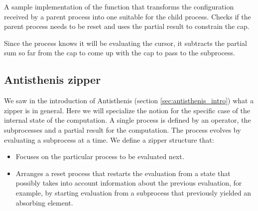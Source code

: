 \begin{code}

  \caption{\label{lst:localizeconf}A sample implementation of the
    function that transforms the configuration received by a parent
    process into one suitable for the child process. Checks if the
    parent process needs to be reset and uses the partial result to
    constrain the cap.}
\end{code}

Since the process knows it will be evaluating the cursor, it subtracts
the partial sum so far from the cap to come up with the cap to pass to
the subprocess.


\subsection{Antisthenis zipper}
\label{sec:zipper}
We saw in the introduction of Antisthenis
(section \ref{sec:antisthenis_intro}) what a zipper is in general. Here we
will specialize the notion for the specific case of the internal state
of the computation. A single process is defined by an operator, the
subprocesses and a partial result for the computation. The process
evolves by evaluating a subprocess at a time. We define a zipper
structure that:

\begin{itemize}
\item Focuses on the particular process to be evaluated next.
\item Arranges a reset process that restarts the evaluation from a
  state that possibly takes into account information about the
  previous evaluation, for example, by starting evaluation from a
  subprocess that previously yielded an absorbing element.
\end{itemize}


